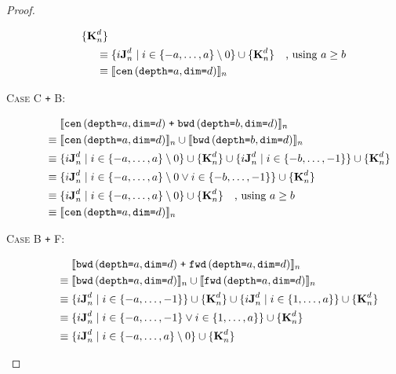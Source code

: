 \begin{proof}
\begin{description}
\begin{align*}
                  \{\zeroEntry{d}{n}\} \\
      \equiv & \; \{i\singleEntry{d}{n} \mid i \in \{-a, \ldots, a\} \setminus 0 \} \cup \{\zeroEntry{d}{n}\} \quad \text{, using }a \geq b \\
      \equiv & \; \interp{\stenCenS{a}{d}}_n \\
    \end{align*}
  \item[\textsc{Case C \texttt{+} B}:]
    \begin{align*}
      & \; \interp{\stenCenS{a}{d} \; \texttt{+} \; \stenBwdS{b}{d}}_{n} \\
      \equiv & \; \interp{\stenCenS{a}{d}}_{n} \cup \interp{\stenBwdS{b}{d}}_{n} \\
      \equiv & \; \{i\singleEntry{d}{n} \mid i \in \{-a, \ldots, a\} \setminus 0 \} \cup
                  \{\zeroEntry{d}{n}\} \cup
                  \{i\singleEntry{d}{n} \mid i \in \{-b, \ldots, -1\} \} \cup
                  \{\zeroEntry{d}{n}\} \\
      \equiv & \; \{i\singleEntry{d}{n} \mid i \in \{-a, \ldots, a\} \setminus 0
                    \vee i \in \{-b, \ldots, -1\} \} \cup
                  \{\zeroEntry{d}{n}\} \\
      \equiv & \; \{i\singleEntry{d}{n} \mid i \in \{-a, \ldots, a\} \setminus 0 \} \cup \{ \zeroEntry{d}{n}\} \quad \text{, using }a \geq b \\
      \equiv & \; \interp{\stenCenS{a}{d}}_n \\
    \end{align*}
  \item[\textsc{Case B \texttt{+} F}:]
    \begin{align*}
      & \; \interp{\stenBwdS{a}{d} \; \texttt{+} \; \stenFwdS{a}{d}}_{n} \\
      \equiv & \; \interp{\stenBwdS{a}{d}}_{n} \cup \interp{\stenFwdS{a}{d}}_{n} \\
      \equiv & \; \{i\singleEntry{d}{n} \mid i \in \{-a, \ldots, -1\} \} \cup
                  \{\zeroEntry{d}{n}\} \cup
                  \{i\singleEntry{d}{n} \mid i \in \{1, \ldots, a\} \} \cup
                  \{\zeroEntry{d}{n}\} \\
      \equiv & \; \{i\singleEntry{d}{n} \mid i \in \{-a, \ldots, -1\}
                    \vee i \in \{1, \ldots, a\} \} \cup
                  \{\zeroEntry{d}{n}\} \\
      \equiv & \; \{i\singleEntry{d}{n} \mid i \in \{-a, \ldots, a\} \setminus 0 \} \cup 
                              \{\zeroEntry{d}{n}\} \\

\end{align*}
\end{description}
\end{proof}
